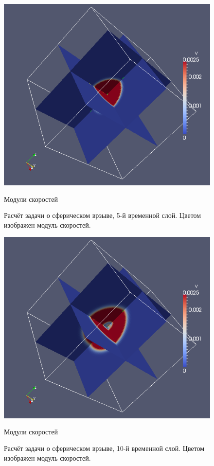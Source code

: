 \begin{figure}[htp]
\centering
\includegraphics[width=\textwidth]{png/spherical-explosion-test/v-scalar/0005.png}
\caption{Модули скоростей}
\caption{Расчёт задачи о сферическом врзыве, 5-й временной слой. Цветом изображен модуль скоростей.}
\end{figure}

\begin{figure}[htp]
\centering
\includegraphics[width=\textwidth]{png/spherical-explosion-test/v-scalar/0010.png}
\caption{Модули скоростей}
\caption{Расчёт задачи о сферическом врзыве, 10-й временной слой. Цветом изображен модуль скоростей.}
\end{figure}

